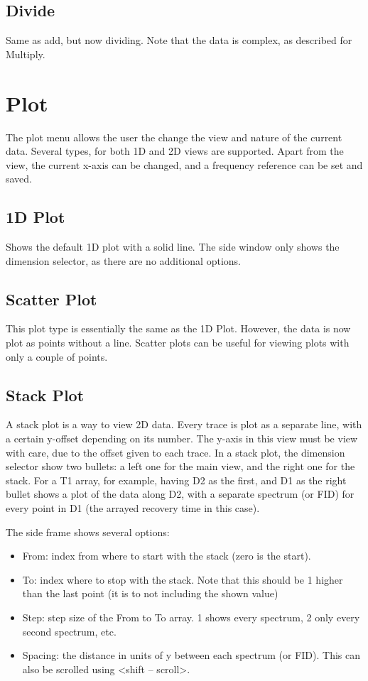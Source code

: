 \documentclass[11pt,a4paper]{article}
\begin{document}
\subsection{Divide}
Same as add, but now dividing. Note that the data is complex, as described for Multiply.




\section{Plot}
The plot menu allows the user the change the view and nature of the current data. Several types, for both 1D and 2D views are supported. Apart from the view, the current x-axis can be changed, and a
frequency reference can be set and saved.


\subsection{1D Plot}
Shows the default 1D plot with a solid line. The side window only shows the dimension selector, as there are no additional options.


\subsection{Scatter Plot}
This plot type is essentially the same as the 1D Plot. However, the data is now plot as points without a line. Scatter plots can be useful for viewing
plots with only a couple of points.

\subsection{Stack Plot}
A stack plot is a way to view 2D data. Every trace is plot as a separate line, with a certain y-offset depending on its number. The y-axis in this view must be view with care,
due to the offset given to each trace. In a stack plot, the dimension selector show two bullets: a left one for the main view, and the right one for the stack. For a T1 array, for example, having D2 as the first, and D1
as the right bullet shows a plot of the data along D2, with a separate spectrum (or FID) for every point in D1 (the arrayed recovery time in this case).

The side frame shows several options:
\begin{itemize}
  \item From: index from where to start with the stack (zero is the start).
  \item To: index where to stop with the stack. Note that this should be 1 higher than the last point (it is to not including the shown value)
  \item Step: step size of the From to To array. 1 shows every spectrum, 2 only every second spectrum, etc.
  \item Spacing: the distance in units of y between each spectrum (or FID). This can also be scrolled using <shift -- scroll>.
\end{itemize}
\end{document}
